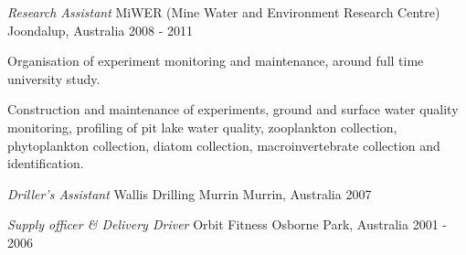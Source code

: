 \begin{cventries}
  \cventry
    {\emph{Research Assistant}} %
    {MiWER (Mine Water and Environment Research Centre)} %
    {Joondalup, Australia} %
    {2008 - 2011} %
    {
      \begin{cvitems} %
        \item {Organisation of experiment monitoring and maintenance, around full time university study.}
        \item {Construction and maintenance of experiments, ground and surface water quality monitoring, profiling of pit lake water quality, zooplankton collection, phytoplankton collection, diatom collection, macroinvertebrate collection and identification.}
      \end{cvitems}
    }

  \cventry
    {\emph{Driller's Assistant}} %
    {Wallis Drilling} %
    {Murrin Murrin, Australia} %
    {2007} %
    {
    }

  \cventry
    {\emph{Supply officer \& Delivery Driver}} %
    {Orbit Fitness} %
    {Osborne Park, Australia} %
    {2001 - 2006} %
    {
    }

\end{cventries}
